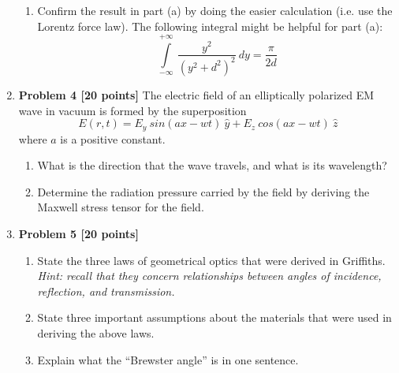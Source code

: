 \documentclass[fleqn]{article}
\begin{document}
\begin{enumerate}
\begin{enumerate}
      \item Confirm the result in part (a) by doing the easier calculation (i.e. use the Lorentz force law).
      The following integral might be helpful for part (a):
      $$
        \int\limits_{-\infty}^{+\infty} ~ \dfrac{y^2}{\left(y^2+d^2\right)^2} ~ dy=\dfrac{\pi}{2d} 
      $$


    \end{enumerate}

    \item \textbf{Problem 4 [20 points]} The electric field of an elliptically polarized EM wave in vacuum is formed by the superposition
      $$
        E(r,t)=E_y ~ sin(ax-wt) ~ \hat{y}+E_z ~ cos(ax-wt) ~ \hat{z}
      $$
      where $a$ is a positive constant.
      \begin{enumerate}
        \item What is the direction that the wave travels, and what is its wavelength?


        \item Determine the radiation pressure carried by the field by deriving the Maxwell stress tensor for
        the field.

        
      \end{enumerate}

    \item \textbf{Problem 5 [20 points]}
    \begin{enumerate}
      \item State the three laws of geometrical optics that were derived in Griffiths. \emph{Hint: recall that they
      concern relationships between angles of incidence, reflection, and transmission.}



      \item State three important assumptions about the materials that were used in deriving the above laws.



      \item Explain what the “Brewster angle” is in one sentence.

      
    \end{enumerate}

  \end{enumerate}
\end{document}
